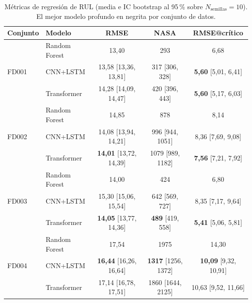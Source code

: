 \documentclass[5p,times,authoryear]{elsarticle}
\begin{document}
\begin{table}[!t]
\centering
\caption{Métricas de regresión de RUL (media e IC bootstrap al 95\,\% sobre $N_{\mathrm{semillas}}{=}10$). El mejor modelo profundo en negrita por conjunto de datos.}
\label{tab:rul}
\small
\begin{tabular}{llccc}
\toprule
Conjunto & Modelo & RMSE & NASA & RMSE@crítico \\
\midrule
\multirow{3}{*}{FD001}
& Random Forest        & 13,40                 & 293               & 6,68 \\
& CNN+LSTM             & 13,58 [13,36, 13,81]  & 317 [306, 328]    & \textbf{5,60} [5,01, 6,41] \\
& Transformer          & 14,28 [14,09, 14,47]  & 420 [396, 443]    & \textbf{5,60} [5,17, 6,03] \\
\multirow{3}{*}{FD002}
& Random Forest        & 14,85                 & 878               & 8,14 \\
& CNN+LSTM             & 14,08 [13,94, 14,21]  & 996 [944, 1051]   & 8,36 [7,69, 9,08] \\
& Transformer          & \textbf{14,01} [13,72, 14,39] & 1079 [989, 1182] & \textbf{7,56} [7,21, 7,92] \\
\multirow{3}{*}{FD003}
& Random Forest        & 14,00                 & 424               & 6,80 \\
& CNN+LSTM             & 15,30 [15,06, 15,54]  & 642 [569, 727]    & 8,35 [7,17, 9,64] \\
& Transformer          & \textbf{14,05} [13,77, 14,36] & \textbf{489} [419, 558] & \textbf{5,41} [5,06, 5,81] \\
\multirow{3}{*}{FD004}
& Random Forest        & 17,54                 & 1975              & 14,30 \\
& CNN+LSTM             & \textbf{16,44} [16,26, 16,64] & \textbf{1317} [1256, 1372] & \textbf{10,09} [9,32, 10,91] \\
& Transformer          & 17,14 [16,78, 17,51]  & 1860 [1644, 2125] & 10,63 [9,52, 11,66] \\
\bottomrule
\end{tabular}
\end{table}
\end{document}
